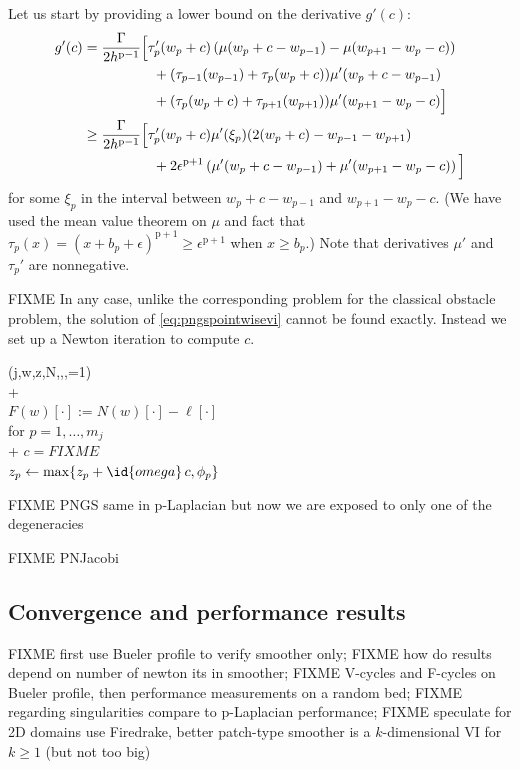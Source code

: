 \documentclass[letterpaper,final,12pt,reqno]{amsart}
\theoremstyle{claim}
\newcommand{\eps}{\epsilon}
\newcommand{\pp}{{\text{p}}}
\numberwithin{equation}{section}
\numberwithin{figure}{section}
\numberwithin{table}{section}
\numberwithin{theorem}{section}
\begin{document}
Let us start by providing a lower bound on the derivative $g'(c)$:
\begin{align}
  g'(c) &= \frac{\Gamma}{2h^{\pp-1}} \Big[\tau_p'(w_p+c) \left(\mu(w_p+c-w_{p-1}) -  \mu(w_{p+1}-w_p-c)\right) \label{eq:pngsderivativebound} \\
        &\qquad\qquad\quad + (\tau_{p-1}(w_{p-1}) + \tau_p(w_p+c)) \mu'(w_p+c-w_{p-1}) \notag \\
        &\qquad\qquad\quad + (\tau_p(w_p+c) + \tau_{p+1}(w_{p+1})) \mu'(w_{p+1}-w_p-c)\Big] \notag \\
        &\ge \frac{\Gamma}{2h^{\pp-1}} \Big[\tau_p'(w_p+c) \mu'(\xi_p) (2(w_p+c) - w_{p-1} - w_{p+1}) \notag \\
        &\qquad\qquad\quad + 2 \eps^{\pp+1} \left(\mu'(w_p+c-w_{p-1}) + \mu'(w_{p+1}-w_p-c)\right)\Big] \notag
\end{align}
for some $\xi_p$ in the interval between $w_p+c-w_{p-1}$ and $w_{p+1}-w_p-c$.  (We have used the mean value theorem on $\mu$ and fact that $\tau_p(x) = (x+b_p+\eps)^{\pp+1} \ge \eps^{\pp+1}$ when $x\ge b_p$.)  Note that derivatives $\mu'$ and $\tau_p'$ are nonnegative.

FIXME In any case, unlike the corresponding problem for the classical obstacle problem, the solution of \eqref{eq:pngspointwisevi} cannot be found exactly.  Instead we set up a Newton iteration to compute $c$.

\begin{pseudo*} \label{ps:pngs}
(j,w,z,N,\ell,\phi,=1)\text{:} \\+
     \\
    $F(w)[\cdot] := N(w)[\cdot] - \ell[\cdot]$ \\
    for $p=1,\dots,m_j$ \\+
        $c = FIXME$ \\
        $z_p \gets \max\{z_p + \id{omega}\,c, \phi_p\}$
\end{pseudo*}

FIXME PNGS same in $\pp$-Laplacian but now we are exposed to only one of the degeneracies

FIXME PNJacobi

\subsection{Convergence and performance results} \label{subsec:siaperformance}  FIXME first use Bueler profile to verify smoother only; FIXME how do results depend on number of newton its in smoother; FIXME V-cycles and F-cycles on Bueler profile, then performance measurements on a random bed; FIXME regarding singularities compare to $\pp$-Laplacian performance; FIXME speculate for 2D domains use Firedrake, better patch-type smoother is a $k$-dimensional VI for $k\ge 1$ (but not too big)
\end{document}
